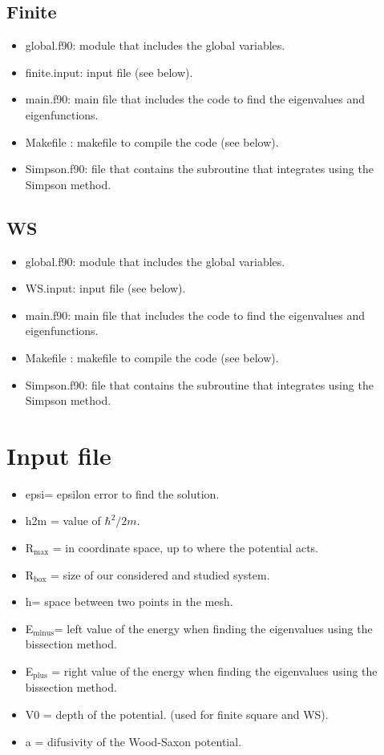\documentclass[a4paper,10pt]{article}
\begin{document}
\subsection{Finite}
\begin{itemize}
 \item global.f90: module that includes the global variables. 
 \item finite.input: input file (see below).
 \item main.f90: main file that includes the code to find the eigenvalues and eigenfunctions. 
 \item Makefile : makefile to compile the code (see below). 
 \item Simpson.f90: file that contains the subroutine that integrates using the Simpson method.
\end{itemize}
\subsection{WS}
\begin{itemize}
 \item global.f90: module that includes the global variables. 
 \item WS.input: input file (see below).
 \item main.f90: main file that includes the code to find the eigenvalues and eigenfunctions. 
 \item Makefile : makefile to compile the code (see below). 
 \item Simpson.f90: file that contains the subroutine that integrates using the Simpson method.
\end{itemize}



\section{Input file}
\begin{itemize}
 \item epsi= epsilon error to find the solution. 
 \item h2m = value of $\hbar^2/2m$.
 \item R$_\mathrm{max}$ = in coordinate space, up to where the potential acts.
 \item R$_\mathrm{box}$ = size of our considered and studied system.
 \item h= space between two points in the mesh.
 \item E$_\mathrm{minus}$= left value of the energy when finding the eigenvalues using the bissection method.
 \item E$_\mathrm{plus}$ = right value of the energy when finding the eigenvalues using the bissection method.
 \item V0 = depth of the potential. (used for finite square and WS).
 \item a = difusivity of the Wood-Saxon potential. 
\end{itemize}
\end{document}
